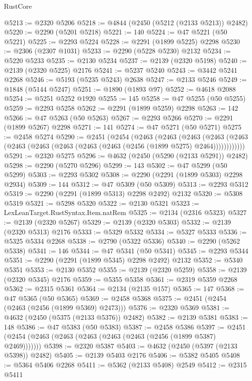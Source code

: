\begin{lexlean}{RustCore}
\begin{coremodule}
@5213 := @2320 @5206
@5218 := @4844 (@2450 (@5212 (@2133 @5213)) @2482)
@5220 := @2290 (@5201 @5218)
@5221 := 140
@5224 := @47 @5221 (@50 @5221)
@5225 := @2293 @5224
@5228 := @2291 (@1899 @5225) @2298
@5230 := @2306 (@2307 @1031)
@5233 := @2290 (@5228 @5230) @2132
@5234 := @5220 @5233
@5235 := @2130 @5234
@5237 := @2139 (@2320 @5198)
@5240 := @2139 (@2320 @5225) @2176
@5241 := @5237 @5240
@5243 := @3442 @5241 @2268
@5246 := @5193 (@5235 @5243) @2638
@5247 := @2133 @5246
@5249 := @1848 (@5144 @5247)
@5251 := @1890 (@1893 @97)
@5252 := @4618 @2088
@5254 := @5251 @5252 @1920
@5255 := 145
@5258 := @47 @5255 (@50 @5255)
@5259 := @2293 @5258
@5262 := @2291 (@1899 @5259) @2298
@5263 := 142
@5266 := @47 @5263 (@50 @5263)
@5267 := @2293 @5266
@5270 := @2291 (@1899 @5267) @2298
@5271 := 141
@5274 := @47 @5271 (@50 @5271)
@5275 := @2458 @5274
@5290 := @2451
    (@2454
      (@2463
        (@2463
          (@2463
            (@2463 (@2463 (@2463 (@2463 (@2463 (@2463 (@2463 (@2456 (@1899 @5275) @2464))))))))))))
@5291 := @2320 @5275
@5296 := @4632 (@2450 (@5290 (@2133 @5291)) @2482)
@5298 := @2290 (@5270 @5296)
@5299 := 143
@5302 := @47 @5299 (@50 @5299)
@5303 := @2293 @5302
@5308 := @2290 (@2291 (@1899 @5303) @2298 @2934)
@5309 := 144
@5312 := @47 @5309 (@50 @5309)
@5313 := @2293 @5312
@5319 := @2290 (@2291 (@1899 @5313) @2298 @2492) @2132
@5320 := @5308 @5319
@5321 := @5298 @5320
@5322 := @2130 @5321
@5323 := LexLeanTarget.RustSyntax.Item.natRem
@5325 := @2134 (@2316 @5323)
@5327 := @2139 (@2320 @5267)
@5329 := @2139 (@2320 @5303)
@5332 := @2139 (@2320 @5313) @2176
@5333 := @5329 @5332
@5334 := @5327 @5333
@5336 := @5325 @5334 @2268
@5338 := @2790 (@5322 @5336)
@5340 := @2290 (@5262 @5338)
@5341 := 146
@5344 := @47 @5341 (@50 @5341)
@5345 := @2293 @5344
@5351 := @2290 (@2291 (@1899 @5345) @2298 @2492) @2132
@5352 := @5340 @5351
@5353 := @2130 @5352
@5355 := @2139 (@2320 @5259)
@5358 := @2139 (@2320 @5345) @2176
@5359 := @5355 @5358
@5361 := @2319 @5359 @2268
@5362 := @2315 @5361
@5364 := @2134 (@2135 @157)
@5365 := 147
@5368 := @47 @5365 (@50 @5365)
@5369 := @2458 @5368
@5375 := @2451 (@2454 (@2463 (@2456 (@1899 @5369) @2473)))
@5376 := @2320 @5369
@5381 := @4632 (@2450 (@5375 (@2133 @5376)) @2482)
@5382 := @2139 @5381
@5383 := 148
@5386 := @47 @5383 (@50 @5383)
@5387 := @2458 @5386
@5397 := @2451 (@2454 (@2463 (@2463 (@2463 (@2463 (@2463 (@2456 (@1899 @5387) @2469)))))))
@5398 := @2320 @5387
@5403 := @4632 (@2450 (@5397 (@2133 @5398)) @2482)
@5405 := @2139 @5403 @2176
@5406 := @5382 @5405
@5408 := @5364 @5406 @2268
@5411 := @5362 (@2133 @5408) @2549
@5412 := @2315 @5411

\end{coremodule}
\end{lexlean}
